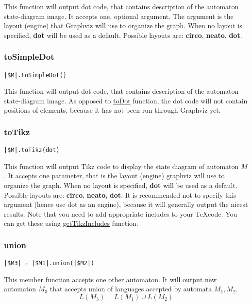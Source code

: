 \documentclass{ctuthesis}
\begin{document}
This function will output dot code, that contains description of the automaton state-diagram image. It accepts one, optional argument. The argument is the layout (engine) that Graphviz will use to organize the graph. When no layout is specified, \textbf{dot} will be used as a default. Possible layouts are: \textbf{circo}, \textbf{neato}, \textbf{dot}. 

\subsubsection{toSimpleDot}
\begin{lstlisting}[language = JASL_snippet]
	|$M|.toSimpleDot()
\end{lstlisting}

This function will output dot code, that contains description of the automaton state-diagram image. As opposed to \hyperref[subsec:toDot]{toDot} function, the dot code will not contain positions of elements, because it has not been run through Graphviz yet. 

\subsubsection{toTikz}
\begin{lstlisting}[language = JASL_snippet]
	|$M|.toTikz(dot)
\end{lstlisting}

This function will output Tikz code to display the state diagram of automaton $M$. It accepts one parameter, that is the layout (engine) graphviz will use to organize the graph. When no layout is specified, \textbf{dot} will be used as a default. Possible layouts are: \textbf{circo}, \textbf{neato}, \textbf{dot}. It is recommended not to specify this argument (hence use dot as an engine), because it will generally output the nicest results. Note that you need to add appropriate includes to your \TeX code. You can get these using \hyperref[subsec:getTikzIncludes]{getTikzIncludes} function.

\subsubsection{union}
\begin{lstlisting}[language = JASL_snippet]
	|$M3| = |$M1|.union(|$M2|)
\end{lstlisting}

This member function accepts one other automaton. It will output new automaton $M_3$ that accepts union of languages accepted by automata $M_1, M_2$. 
\begin{equation*}
L(M_3) = L(M_1) \cup L(M_2)
\end{equation*}
\end{document}
